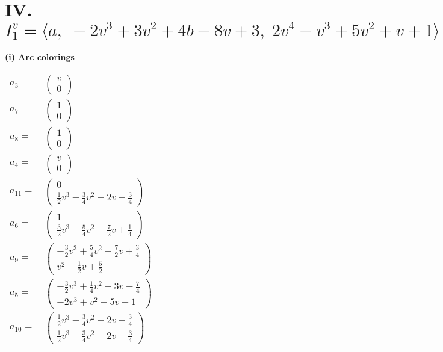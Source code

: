 \documentclass[1p]{elsarticle_modified}
\theoremstyle{definition}
\begin{document}
\centering \section*{IV. $I^v_{1}= \langle a,\;-2 v^3+3 v^2+4 b-8 v+3,\;2 v^4- v^3+5 v^2+v+1 \rangle$}
\flushleft \textbf{(i) Arc colorings}\\
\begin{tabular}{m{7pt} m{180pt} m{7pt} m{180pt} }
\flushright $a_{3}=$&$\begin{pmatrix}v\\0\end{pmatrix}$ \\
\flushright $a_{7}=$&$\begin{pmatrix}1\\0\end{pmatrix}$ \\
\flushright $a_{8}=$&$\begin{pmatrix}1\\0\end{pmatrix}$ \\
\flushright $a_{4}=$&$\begin{pmatrix}v\\0\end{pmatrix}$ \\
\flushright $a_{11}=$&$\begin{pmatrix}0\\\frac{1}{2} v^3-\frac{3}{4} v^2+2 v-\frac{3}{4}\end{pmatrix}$ \\
\flushright $a_{6}=$&$\begin{pmatrix}1\\\frac{3}{2} v^3-\frac{5}{4} v^2+\frac{7}{2} v+\frac{1}{4}\end{pmatrix}$ \\
\flushright $a_{9}=$&$\begin{pmatrix}-\frac{3}{2} v^3+\frac{5}{4} v^2-\frac{7}{2} v+\frac{3}{4}\\v^2-\frac{1}{2} v+\frac{5}{2}\end{pmatrix}$ \\
\flushright $a_{5}=$&$\begin{pmatrix}-\frac{3}{2} v^3+\frac{1}{4} v^2-3 v-\frac{7}{4}\\-2 v^3+v^2-5 v-1\end{pmatrix}$ \\
\flushright $a_{10}=$&$\begin{pmatrix}\frac{1}{2} v^3-\frac{3}{4} v^2+2 v-\frac{3}{4}\\\frac{1}{2} v^3-\frac{3}{4} v^2+2 v-\frac{3}{4}\end{pmatrix}$ \\

\end{tabular}
\end{document}
